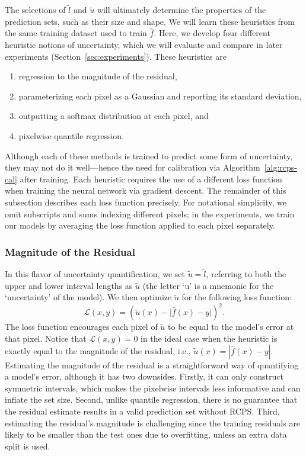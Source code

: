 \documentclass[10pt]{article}
\begin{document}
The selections of $\tilde{l}$ and $\tilde{u}$ will ultimately determine the properties of the prediction sets, such as their size and shape.
We will learn these heuristics from the same training dataset used to train $\hat{f}$.
Here, we develop four different heuristic notions of uncertainty, which we will evaluate and compare in later experiments (Section~\ref{sec:experiments}).
These heuristics are
\begin{enumerate}
    \item regression to the magnitude of the residual,
    \item parameterizing each pixel as a Gaussian and reporting its standard deviation,
    \item outputting a softmax distribution at each pixel, and
    \item pixelwise quantile regression.
\end{enumerate}

Although each of these methods is trained to predict some form of uncertainty, they may not do it well---hence the need for calibration via Algorithm~\ref{alg:rcps-cal} after training.
Each heuristic requires the use of a different loss function when training the neural network via gradient descent.
The remainder of this subsection describes each loss function precisely.
For notational simplicity, we omit subscripts and sums indexing different pixels; in the experiments, we train our models by averaging the loss function applied to each pixel separately.

\subsubsection{Magnitude of the Residual}
\label{subsec:res-mag}
In this flavor of uncertainty quantification, we set $\tilde{u}=\tilde{l}$, referring to both the upper and lower interval lengths as $\tilde{u}$ (the letter `u' is a mnemonic for the `uncertainty' of the model).
We then optimize $\tilde{u}$ for the following loss function:
\begin{equation}
    \mathcal{L}(x,y) = \left(\tilde{u}(x) - \big|\hat{f}(x) - y\big|\right)^2.
\end{equation}
The loss function encourages each pixel of $\tilde{u}$ to be equal to the model's error at that pixel.
Notice that $\mathcal{L}(x,y)=0$ in the ideal case when the heuristic is exactly equal to the magnitude of the residual, i.e., $\tilde{u}(x) = |\hat{f}(x)-y|$.
Estimating the magnitude of the residual is a straightforward way of quantifying a model's error, although it has two downsides.
Firstly, it can only construct symmetric intervals, which makes the pixelwise intervals less informative and can inflate the set size.
Second, unlike quantile regression, there is no guarantee that the residual estimate results in a valid prediction set without RCPS.
Third, estimating the residual's magnitude is challenging since the training residuals are likely to be smaller than the test ones due to overfitting, unless an extra data split is used.
\end{document}
